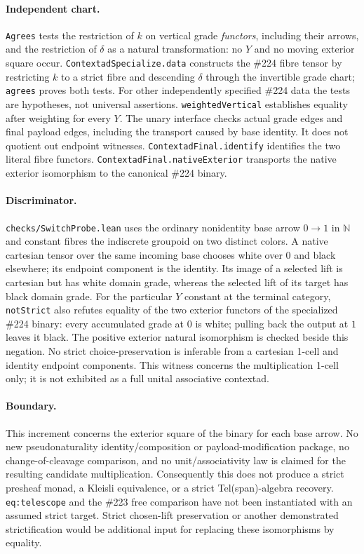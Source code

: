 \documentclass{article}
\begin{document}
\paragraph{Independent chart.} \texttt{Agrees} tests the restriction of $k$ on vertical grade
\emph{functors}, including their arrows, and the restriction of $\delta$ as a natural transformation:
no $Y$ and no moving exterior square occur. \texttt{ContextadSpecialize.data} constructs the \#224
fibre tensor by restricting $k$ to a strict fibre and descending $\delta$ through the invertible grade
chart; \texttt{agrees} proves both tests. For other independently specified \#224 data the tests are
hypotheses, not universal assertions. \texttt{weightedVertical} establishes equality after weighting for
every $Y$. The unary interface checks actual grade edges and final payload edges, including the transport
caused by base identity. It does not quotient out endpoint witnesses. \texttt{ContextadFinal.identify} identifies the
two literal fibre functors. \texttt{ContextadFinal.nativeExterior} transports the native exterior
isomorphism to the canonical \#224 binary.
\paragraph{Discriminator.} \texttt{checks/SwitchProbe.lean} uses the ordinary nonidentity base arrow
$0\to1$ in $\mathbb N$ and constant fibres the indiscrete groupoid on two distinct colors. A native
cartesian tensor over the same incoming base chooses white over $0$ and black elsewhere; its endpoint
component is the identity. Its image of a selected lift is cartesian but has white domain grade,
whereas the selected lift of its target has black domain grade. For the particular $Y$ constant at the terminal category, \texttt{notStrict} also refutes equality
of the two exterior functors of the specialized \#224 binary: every accumulated grade at $0$ is white;
pulling back the output at $1$ leaves it black. The positive exterior natural isomorphism is checked
beside this negation. No strict choice-preservation
is inferable from a cartesian 1-cell and identity endpoint components. This witness concerns the
multiplication 1-cell only; it is not exhibited as a full unital associative contextad.
\paragraph{Boundary.} This increment concerns the exterior square of the binary for each base arrow.
No new pseudonaturality identity/composition or payload-modification package, no change-of-cleavage
comparison, and no unit/associativity law is claimed for the resulting candidate multiplication.
Consequently this does not produce a strict presheaf monad, a Kleisli equivalence, or a strict
Tel(span)-algebra recovery. \texttt{eq:telescope} and the \#223 free comparison have not been
instantiated with an assumed strict target. Strict chosen-lift preservation or another demonstrated
strictification would be additional input for replacing these isomorphisms by equality.
\end{document}
